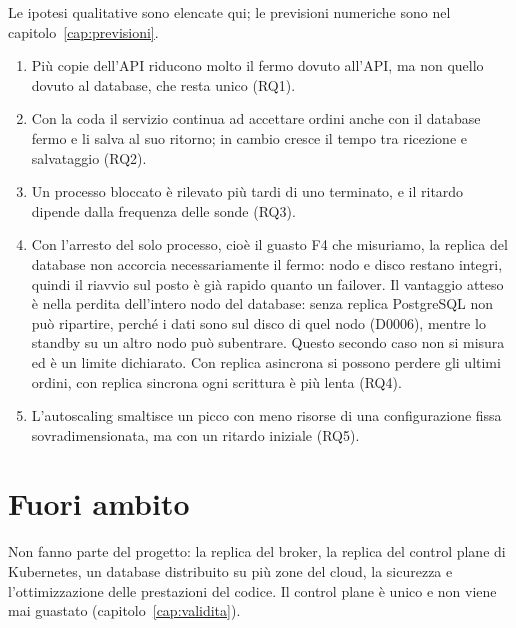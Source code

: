 Le ipotesi qualitative sono elencate qui; le previsioni numeriche sono nel capitolo~\ref{cap:previsioni}.

\begin{enumerate}[label=\textbf{H\arabic*}]
  \item Più copie dell'API riducono molto il fermo dovuto all'API, ma non quello dovuto al database, che resta unico (RQ1).
  \item Con la coda il servizio continua ad accettare ordini anche con il database fermo e li salva al suo ritorno; in cambio cresce il tempo tra ricezione e salvataggio (RQ2).
  \item Un processo bloccato è rilevato più tardi di uno terminato, e il ritardo dipende dalla frequenza delle sonde (RQ3).
  \item Con l'arresto del solo processo, cioè il guasto F4 che misuriamo, la replica del database non accorcia necessariamente il fermo: nodo e disco restano integri, quindi il riavvio sul posto è già rapido quanto un failover. Il vantaggio atteso è nella perdita dell'intero nodo del database: senza replica PostgreSQL non può ripartire, perché i dati sono sul disco di quel nodo (D0006), mentre lo standby su un altro nodo può subentrare. Questo secondo caso non si misura ed è un limite dichiarato. Con replica asincrona si possono perdere gli ultimi ordini, con replica sincrona ogni scrittura è più lenta (RQ4).
  \item L'autoscaling smaltisce un picco con meno risorse di una configurazione fissa sovradimensionata, ma con un ritardo iniziale (RQ5).
\end{enumerate}

\section{Fuori ambito}

Non fanno parte del progetto: la replica del broker, la replica del control plane di Kubernetes, un database distribuito su più zone del cloud, la sicurezza e l'ottimizzazione delle prestazioni del codice. Il control plane è unico e non viene mai guastato (capitolo~\ref{cap:validita}).
